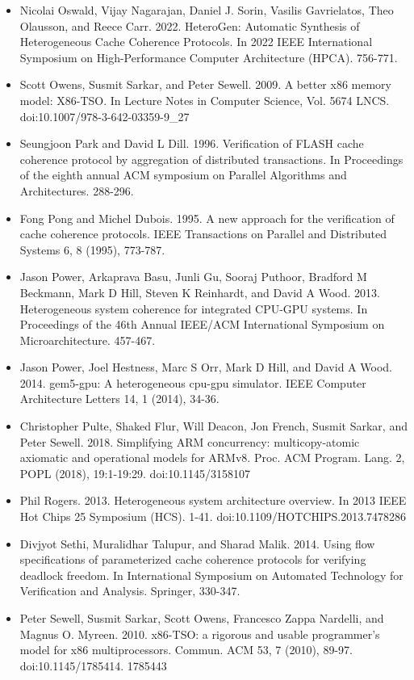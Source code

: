\documentclass[10pt]{article}
\begin{document}
\begin{itemize}
  \item[] [32] Nicolai Oswald, Vijay Nagarajan, Daniel J. Sorin, Vasilis Gavrielatos, Theo Olausson, and Reece Carr. 2022. HeteroGen: Automatic Synthesis of Heterogeneous Cache Coherence Protocols. In 2022 IEEE International Symposium on High-Performance Computer Architecture (HPCA). 756-771.
  \item[] [33] Scott Owens, Susmit Sarkar, and Peter Sewell. 2009. A better x86 memory model: X86-TSO. In Lecture Notes in Computer Science, Vol. 5674 LNCS. doi:10.1007/978-3-642-03359-9\_27
  \item[] [34] Seungjoon Park and David L Dill. 1996. Verification of FLASH cache coherence protocol by aggregation of distributed transactions. In Proceedings of the eighth annual ACM symposium on Parallel Algorithms and Architectures. 288-296.
  \item[] [35] Fong Pong and Michel Dubois. 1995. A new approach for the verification of cache coherence protocols. IEEE Transactions on Parallel and Distributed Systems 6, 8 (1995), 773-787.
  \item[] [36] Jason Power, Arkaprava Basu, Junli Gu, Sooraj Puthoor, Bradford M Beckmann, Mark D Hill, Steven K Reinhardt, and David A Wood. 2013. Heterogeneous system coherence for integrated CPU-GPU systems. In Proceedings of the 46th Annual IEEE/ACM International Symposium on Microarchitecture. 457-467.
  \item[] [37] Jason Power, Joel Hestness, Marc S Orr, Mark D Hill, and David A Wood. 2014. gem5-gpu: A heterogeneous cpu-gpu simulator. IEEE Computer Architecture Letters 14, 1 (2014), 34-36.
  \item[] [38] Christopher Pulte, Shaked Flur, Will Deacon, Jon French, Susmit Sarkar, and Peter Sewell. 2018. Simplifying ARM concurrency: multicopy-atomic axiomatic and operational models for ARMv8. Proc. ACM Program. Lang. 2, POPL (2018), 19:1-19:29. doi:10.1145/3158107
  \item[] [39] Phil Rogers. 2013. Heterogeneous system architecture overview. In 2013 IEEE Hot Chips 25 Symposium (HCS). 1-41. doi:10.1109/HOTCHIPS.2013.7478286
  \item[] [40] Divjyot Sethi, Muralidhar Talupur, and Sharad Malik. 2014. Using flow specifications of parameterized cache coherence protocols for verifying deadlock freedom. In International Symposium on Automated Technology for Verification and Analysis. Springer, 330-347.
  \item[] [41] Peter Sewell, Susmit Sarkar, Scott Owens, Francesco Zappa Nardelli, and Magnus O. Myreen. 2010. x86-TSO: a rigorous and usable programmer's model for x86 multiprocessors. Commun. ACM 53, 7 (2010), 89-97. doi:10.1145/1785414. 1785443

\end{itemize}
\end{document}
